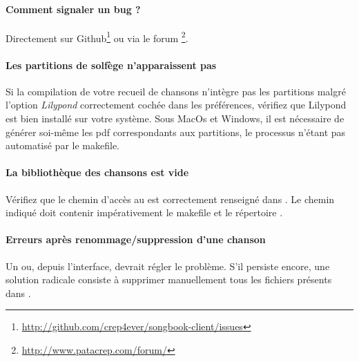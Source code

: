 \paragraph{Comment signaler un bug ?}
Directement sur
Github\footnote{\url{http://github.com/crep4ever/songbook-client/issues}}
ou via le forum \footnote{\url{http://www.patacrep.com/forum/}}.

\paragraph{Les partitions de solfège n'apparaissent pas}
Si la compilation de votre recueil de chansons n'intègre pas les
partitions malgré l'option \emph{Lilypond} correctement cochée dans
les préférences, vérifiez que Lilypond est bien installé sur votre
système. Sous MacOs et Windows, il est nécessaire de générer soi-même
les pdf correspondants aux partitions, le processus n'étant pas
automatisé par le makefile.

\paragraph{La bibliothèque des chansons est vide} 
Vérifiez que le chemin d'accès au \recueil{} est correctement
renseigné dans . Le chemin indiqué doit contenir
impérativement le makefile et le répertoire .

\paragraph{Erreurs après renommage/suppression d'une chanson} 
Un  ou, depuis l'interface,  devrait
régler le problème. S'il persiste encore, une solution radicale
consiste à supprimer manuellement tous les fichiers  présents
dans .
